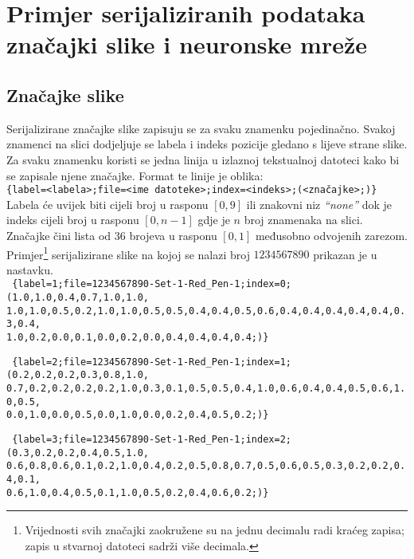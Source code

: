 \chapter{Primjer serijaliziranih podataka značajki slike i neuronske mreže}
\label{ch:primjer-serijaliziranih-podataka-znacajki-slike-i-neuronske-mreze}

\section*{Značajke slike}
Serijalizirane značajke slike zapisuju se za svaku znamenku pojedinačno. Svakoj znamenci na slici dodjeljuje se labela
i indeks pozicije gledano s lijeve strane slike. Za svaku znamenku koristi se jedna linija u izlaznoj tekstualnoj
datoteci kako bi se zapisale njene značajke. Format te linije je oblika:\\
\footnotesize
\texttt{\{label=<labela>;file=<ime datoteke>;index=<indeks>;(<značajke>;)\}}\\
\normalsize
Labela će uvijek biti cijeli broj u rasponu $[0, 9]$ ili znakovni niz \emph{``none''} dok je indeks cijeli broj u
rasponu $[0, n - 1]$ gdje je $n$ broj znamenaka na slici. Značajke čini lista od 36 brojeva u rasponu $[0, 1]$ međusobno
odvojenih zarezom. Primjer\footnote{Vrijednosti svih značajki zaokružene su na jednu decimalu radi kraćeg zapisa;
zapis u stvarnoj datoteci sadrži više decimala.} serijalizirane slike na kojoj se nalazi broj $1234567890$ prikazan je u
nastavku.\\

\scriptsize
\texttt{
\{label=1;file=1234567890-Set-1-Red\_Pen-1;index=0;(1.0,1.0,0.4,0.7,1.0,1.0,\\
1.0,1.0,0.5,0.2,1.0,1.0,0.5,0.5,0.4,0.4,0.5,0.6,0.4,0.4,0.4,0.4,0.4,0.3,0.4,\\
1.0,0.2,0.0,0.1,0.0,0.2,0.0,0.4,0.4,0.4,0.4;)\}\\
}

\texttt{
\{label=2;file=1234567890-Set-1-Red\_Pen-1;index=1;(0.2,0.2,0.2,0.3,0.8,1.0,\\
0.7,0.2,0.2,0.2,0.2,1.0,0.3,0.1,0.5,0.5,0.4,1.0,0.6,0.4,0.4,0.5,0.6,1.0,0.5,\\
0.0,1.0,0.0,0.5,0.0,1.0,0.0,0.2,0.4,0.5,0.2;)\}\\
}

\texttt{
\{label=3;file=1234567890-Set-1-Red\_Pen-1;index=2;(0.3,0.2,0.2,0.4,0.5,1.0,\\
0.6,0.8,0.6,0.1,0.2,1.0,0.4,0.2,0.5,0.8,0.7,0.5,0.6,0.5,0.3,0.2,0.2,0.4,0.1,\\
0.6,1.0,0.4,0.5,0.1,1.0,0.5,0.2,0.4,0.6,0.2;)\}\\
}

